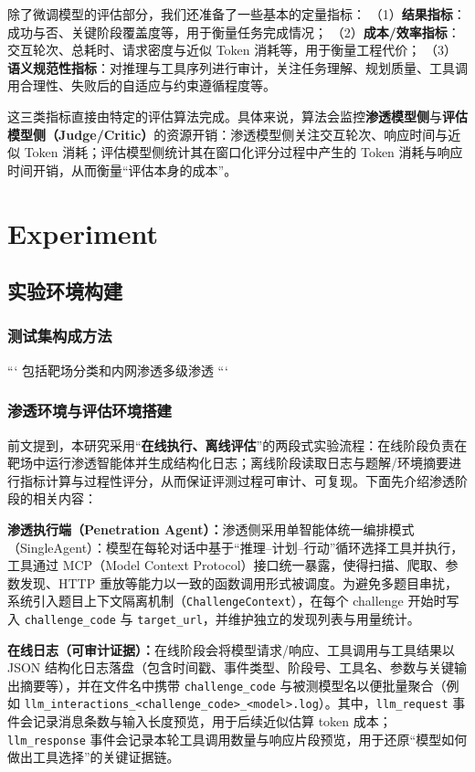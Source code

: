\documentclass[a4paper, twocolumn]{article}
\begin{document}
除了微调模型的评估部分，我们还准备了一些基本的定量指标：
（1）\textbf{结果指标}：成功与否、关键阶段覆盖度等，用于衡量任务完成情况；
（2）\textbf{成本/效率指标}：交互轮次、总耗时、请求密度与近似 Token 消耗等，用于衡量工程代价；
（3）\textbf{语义规范性指标}：对推理与工具序列进行审计，关注任务理解、规划质量、工具调用合理性、失败后的自适应与约束遵循程度等。

这三类指标直接由特定的评估算法完成。具体来说，算法会监控\textbf{渗透模型侧}与\textbf{评估模型侧（Judge/Critic）}的资源开销：渗透模型侧关注交互轮次、响应时间与近似 Token 消耗；评估模型侧统计其在窗口化评分过程中产生的 Token 消耗与响应时间开销，从而衡量“评估本身的成本”。

\section{Experiment}

\subsection{实验环境构建}
\subsubsection{测试集构成方法}
```
包括靶场分类和内网渗透多级渗透
```
\subsubsection{渗透环境与评估环境搭建}
前文提到，本研究采用“\textbf{在线执行、离线评估}”的两段式实验流程：在线阶段负责在靶场中运行渗透智能体并生成结构化日志；离线阶段读取日志与题解/环境摘要进行指标计算与过程性评分，从而保证评测过程可审计、可复现。下面先介绍渗透阶段的相关内容：

\textbf{渗透执行端（Penetration Agent）：}渗透侧采用单智能体统一编排模式（SingleAgent）：模型在每轮对话中基于“推理--计划--行动”循环选择工具并执行，工具通过 MCP（Model Context Protocol）接口统一暴露，使得扫描、爬取、参数发现、HTTP 重放等能力以一致的函数调用形式被调度。为避免多题目串扰，系统引入题目上下文隔离机制（\texttt{ChallengeContext}），在每个 challenge 开始时写入 \texttt{challenge\_code} 与 \texttt{target\_url}，并维护独立的发现列表与用量统计。

\textbf{在线日志（可审计证据）：}在线阶段会将模型请求/响应、工具调用与工具结果以 JSON 结构化日志落盘（包含时间戳、事件类型、阶段号、工具名、参数与关键输出摘要等），并在文件名中携带 \texttt{challenge\_code} 与被测模型名以便批量聚合（例如 \texttt{llm\_interactions\_<challenge\_code>\_<model>.log}）。其中，\texttt{llm\_request} 事件会记录消息条数与输入长度预览，用于后续近似估算 token 成本；\texttt{llm\_response} 事件会记录本轮工具调用数量与响应片段预览，用于还原“模型如何做出工具选择”的关键证据链。
\end{document}
